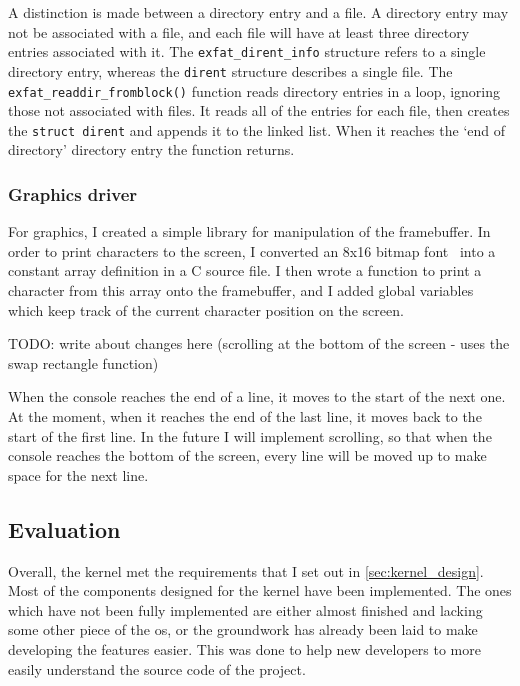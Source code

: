 \documentclass{article}
\begin{document}
A distinction is made between a directory entry and a file. A directory entry
may not be associated with a file, and each file will have at least three
directory entries associated with it. The \verb!exfat_dirent_info! structure
refers to a single directory entry, whereas the \verb!dirent! structure
describes a single file. The \verb!exfat_readdir_fromblock()! function reads
directory entries in a loop, ignoring those not associated with files. It reads
all of the entries for each file, then creates the \verb!struct dirent! and
appends it to the linked list. When it reaches the `end of directory' directory
entry the function returns.

\subsubsection{Graphics driver}
\label{sec:impl_graphics}
For graphics, I created a simple library for manipulation of the framebuffer.
In order to print characters to the screen, I converted an 8x16 bitmap
font~\cite{bizcat-font} into a constant array definition in a C source file. I
then wrote a function to print a character from this array onto the
framebuffer, and I added global variables which keep track of the current
character position on the screen.

TODO: write about changes here (scrolling at the bottom of the screen - uses
the swap rectangle function)

When the console reaches the end of a line, it moves to the start of the next
one. At the moment, when it reaches the end of the last line, it moves back to
the start of the first line. In the future I will implement scrolling, so that
when the console reaches the bottom of the screen, every line will be moved up
to make space for the next line.


\subsection{Evaluation}

Overall, the kernel met the requirements that I set out in
\autoref{sec:kernel_design}. Most of the components designed for the kernel
have been implemented. The ones which have not been fully implemented are
either almost finished and lacking some other piece of the \gls{os}, or the
groundwork has already been laid to make developing the features easier. This
was done to help new developers to more easily understand the source code of
the project.
\end{document}
